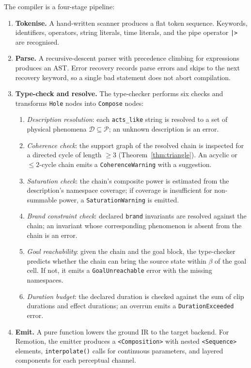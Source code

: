 \documentclass[twocolumn,11pt,a4paper]{article}
\theoremstyle{mee}
\theoremstyle{definition}
\theoremstyle{remark}
\newcommand{\floor}{\beta}
\newcommand{\Desc}{\mathcal{D}}
\newcommand{\Phys}{\mathcal{P}}
\begin{document}
The compiler is a four-stage pipeline:

\begin{enumerate}[leftmargin=1.4em,itemsep=2pt]
\item \textbf{Tokenise.} A hand-written scanner produces a flat token
  sequence. Keywords, identifiers, operators, string literals, time
  literals, and the pipe operator \texttt{|>} are recognised.
\item \textbf{Parse.} A recursive-descent parser with precedence climbing
  for expressions \citep{pratt1973} produces an AST. Error recovery
  records parse errors and skips to the next recovery keyword, so a
  single bad statement does not abort compilation.
\item \textbf{Type-check and resolve.} The type-checker performs six
  checks and transforms \texttt{Hole} nodes into \texttt{Compose} nodes:
  \begin{enumerate}[label=(\alph*),leftmargin=1.6em,itemsep=1pt]
  \item \emph{Description resolution}: each \texttt{acts\_like} string is
    resolved to a set of physical phenomena $\Desc\subseteq\Phys$; an
    unknown description is an error.
  \item \emph{Coherence check}: the support graph of the resolved chain
    is inspected for a directed cycle of length $\ge3$
    (Theorem~\ref{thm:triangle}). An acyclic or $\le2$-cycle chain emits
    a \texttt{CoherenceWarning} with a suggestion.
  \item \emph{Saturation check}: the chain's composite power is estimated
    from the description's namespace coverage; if coverage is insufficient
    for non-summable power, a \texttt{SaturationWarning} is emitted.
  \item \emph{Brand constraint check}: declared \texttt{brand} invariants
    are resolved against the chain; an invariant whose corresponding
    phenomenon is absent from the chain is an error.
  \item \emph{Goal reachability}: given the chain and the goal block, the
    type-checker predicts whether the chain can bring the source state
    within $\floor$ of the goal cell. If not, it emits a
    \texttt{GoalUnreachable} error with the missing namespaces.
  \item \emph{Duration budget}: the declared duration is checked against
    the sum of clip durations and effect durations; an overrun emits a
    \texttt{DurationExceeded} error.
  \end{enumerate}
\item \textbf{Emit.} A pure function lowers the ground IR to the target
  backend. For Remotion, the emitter produces a \texttt{<Composition>}
  with nested \texttt{<Sequence>} elements, \texttt{interpolate()} calls
  for continuous parameters, and layered components for each perceptual
  channel.
\end{enumerate}
\end{document}
